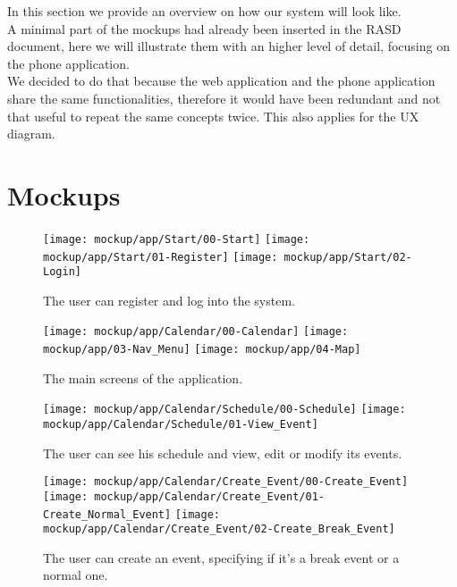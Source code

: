 In this section we provide an overview on how our system will look like.\\
A minimal part of the mockups had already been inserted in the RASD document, here we will illustrate them with an higher level of detail, focusing on the phone application.\\
We decided to do that because the web application and the phone application share the same functionalities, therefore it would have been redundant and not that useful to repeat the same concepts twice.
This also applies for the UX diagram.

\section{Mockups}
\label{subsect:Mockups}
	\begin{figure}[H]
		\texttt{[image: mockup/app/Start/00-Start]}
		\hspace{.3cm}
		\texttt{[image: mockup/app/Start/01-Register]}
		\hspace{.3cm}
		\texttt{[image: mockup/app/Start/02-Login]}
		\centering
		\caption{The user can register and log into the system.}
	\end{figure}
	
	\begin{figure}[H]
		\texttt{[image: mockup/app/Calendar/00-Calendar]}
		\hspace{.3cm}
		\texttt{[image: mockup/app/03-Nav\_Menu]}
		\hspace{.3cm}
		\texttt{[image: mockup/app/04-Map]}
		\centering
		\caption{The main screens of the application.}
	\end{figure}

	\begin{figure}[H]
		\texttt{[image: mockup/app/Calendar/Schedule/00-Schedule]}
		\hspace{.3cm}
		\texttt{[image: mockup/app/Calendar/Schedule/01-View\_Event]}
		\centering 
		\caption{The user can see his schedule and view, edit or modify its events.}
	\end{figure}
	
	\begin{figure}[H]
		\texttt{[image: mockup/app/Calendar/Create\_Event/00-Create\_Event]}
		\hspace{.3cm}
		\texttt{[image: mockup/app/Calendar/Create\_Event/01-Create\_Normal\_Event]}
		\hspace{.3cm}
		\texttt{[image: mockup/app/Calendar/Create\_Event/02-Create\_Break\_Event]}
		\centering 
		\caption{The user can create an event, specifying if it's a break event or a normal one.}
	\end{figure}
	
